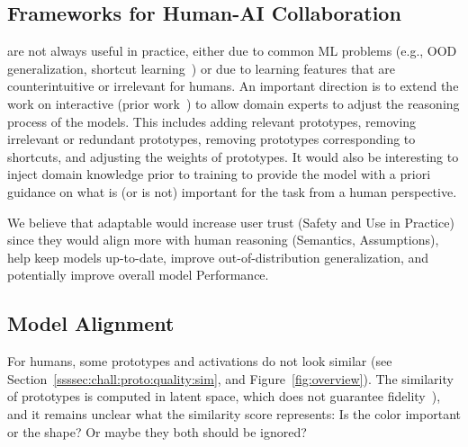 \subsection{Frameworks for Human-AI Collaboration}
\label{ssec:directions:interactive}
\ppms are not always useful in practice, either due to common ML problems (e.g., OOD generalization, shortcut learning~\citep{Geirhos2020_ShortcutLearningDeep}) or due to learning features that are counterintuitive or irrelevant for humans. 
An important direction is to extend the work on interactive \ppms (prior work~\cite{Bontempelli_2023_ConceptlevelDebuggingPartPrototype,Li_2024_ImprovingPrototypicalVisual}) to allow domain experts to adjust the reasoning process of the models. This includes adding relevant prototypes, removing irrelevant or redundant prototypes, removing prototypes corresponding to shortcuts, and adjusting the weights of prototypes.
It would also be interesting to inject domain knowledge prior to training to provide the model with a priori guidance on what is (or is not) important for the task from a human perspective.


We believe that adaptable \ppms would increase user trust (\texorpdfstring{\colorbox[RGB]{242,96,119}{Safety and Use in Practice}}{Safety and Use in Practice})
since they would align more with human reasoning (\texorpdfstring{\colorbox[RGB]{191, 239, 239}{Semantics}}{Semantics}, %
\texorpdfstring{\colorbox[RGB]{255,199,166}{Assumptions}}{Assumptions}),
help keep models up-to-date, improve out-of-distribution generalization, and potentially improve overall model \texorpdfstring{\colorbox[RGB]{156,198,246}{Performance}}{Performance}.

\subsection{Model Alignment}
\label{ssec:directions:alignment}

For humans, some prototypes and activations do not look similar (see Section~\ref{ssssec:chall:proto:quality:sim}, and Figure~\ref{fig:overview}). The similarity of prototypes is computed in latent space, which does not guarantee fidelity~\cite{Xu-Darme_2023_Sanitycheckspatch}), and it remains unclear what the similarity score represents: Is the color important or the shape? Or maybe they both should be ignored?

